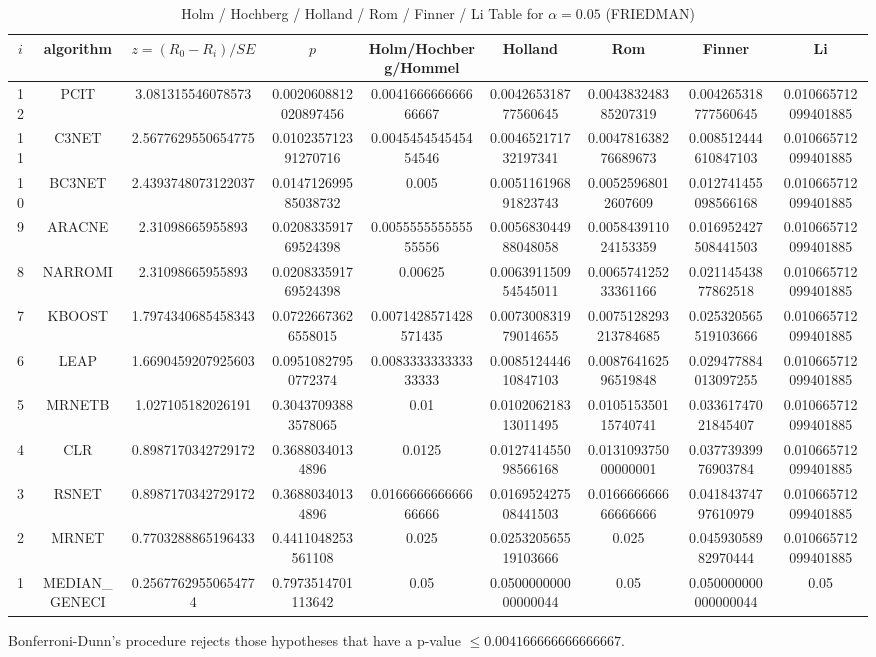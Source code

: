 \documentclass[a4paper,10pt]{article}
\begin{document}
\begin{landscape}
\begin{table}[!htp]
\centering\scriptsize
\caption{Holm / Hochberg / Holland / Rom / Finner / Li Table for $\alpha=0.05$ (FRIEDMAN)}
\begin{tabular}{ccccccccc}
$i$&algorithm&$z=(R_0 - R_i)/SE$&$p$&Holm/Hochberg/Hommel&Holland&Rom&Finner&Li\\
\hline
12&PCIT&3.081315546078573&0.0020608812020897456&0.004166666666666667&0.004265318777560645&0.004383248385207319&0.004265318777560645&0.010665712099401885\\
11&C3NET&2.5677629550654775&0.010235712391270716&0.004545454545454546&0.004652171732197341&0.004781638276689673&0.008512444610847103&0.010665712099401885\\
10&BC3NET&2.4393748073122037&0.014712699585038732&0.005&0.005116196891823743&0.00525968012607609&0.012741455098566168&0.010665712099401885\\
9&ARACNE&2.31098665955893&0.020833591769524398&0.005555555555555556&0.005683044988048058&0.005843911024153359&0.016952427508441503&0.010665712099401885\\
8&NARROMI&2.31098665955893&0.020833591769524398&0.00625&0.006391150954545011&0.006574125233361166&0.02114543877862518&0.010665712099401885\\
7&KBOOST&1.7974340685458343&0.07226673626558015&0.0071428571428571435&0.007300831979014655&0.0075128293213784685&0.025320565519103666&0.010665712099401885\\
6&LEAP&1.6690459207925603&0.09510827950772374&0.008333333333333333&0.008512444610847103&0.008764162596519848&0.029477884013097255&0.010665712099401885\\
5&MRNETB&1.027105182026191&0.30437093883578065&0.01&0.010206218313011495&0.010515350115740741&0.03361747021845407&0.010665712099401885\\
4&CLR&0.8987170342729172&0.36880340134896&0.0125&0.012741455098566168&0.013109375000000001&0.03773939976903784&0.010665712099401885\\
3&RSNET&0.8987170342729172&0.36880340134896&0.016666666666666666&0.016952427508441503&0.016666666666666666&0.04184374797610979&0.010665712099401885\\
2&MRNET&0.7703288865196433&0.4411048253561108&0.025&0.025320565519103666&0.025&0.04593058982970444&0.010665712099401885\\
1&MEDIAN_GENECI&0.25677629550654774&0.7973514701113642&0.05&0.050000000000000044&0.05&0.050000000000000044&0.05\\
\hline
\end{tabular}
\end{table}
Bonferroni-Dunn's procedure rejects those hypotheses that have a p-value $\le0.004166666666666667$.



\end{landscape}
\end{document}
